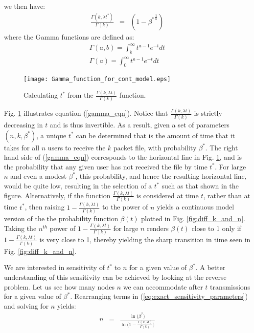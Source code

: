 we then have:
\begin{eqnarray} \label{gamma_eqn}
\frac{\Gamma(k,\lambda t^{*})}{\Gamma(k)} & = &  \left( 1 - {\beta^{*}}^\frac{1}{n} \right)  \label{eq:exact_sensitivity_parameters}
\end{eqnarray}
where the Gamma functions are defined as:
\begin{eqnarray}
\Gamma(a,b) = \int_{b}^{\infty} t^{a-1} e^{-t} dt \nonumber \\ 
\Gamma(a) = \int_{0}^{\infty} t^{a-1} e^{-t} dt \nonumber 
\end{eqnarray}

\begin{figure} [ht]
\centering
\texttt{[image: Gamma\_function\_for\_cont\_model.eps]}
\caption{Calculating $t^{*}$ from the $\frac{\Gamma(k,\lambda t)}{\Gamma(k)}$ function.}
\label{fig:Gamma_function_for_cont_model}
\end{figure}
Fig. \ref{fig:Gamma_function_for_cont_model} illustrates equation (\ref{gamma_eqn}). Notice that $\frac{\Gamma(k,\lambda t)}{\Gamma(k)}$ is strictly decreasing in $t$ and is thus invertible. As a result, given a set of parameters $(n,k,\beta^{*})$, a unique $t^{*}$ can be determined that is the amount of time that it takes for all $n$ users to receive the $k$ packet file, with probability $\beta^{*}$. The right hand side of (\ref{gamma_eqn}) corresponds to the horizontal line in Fig. \ref{fig:Gamma_function_for_cont_model}, and is the probability that any given user has not received the file by time $t^{*}$. For large $n$ and even a modest $\beta^{*}$, this probability, and hence the resulting horizontal line, would be quite low, resulting in the selection of a $t^{*}$ such as that shown in the figure. Alternatively, if the function $\frac{\Gamma(k,\lambda t)}{\Gamma(k)}$ is considered at time $t$, rather than at time $t^*$, then raising $1 - \frac{\Gamma(k,\lambda  t)}{\Gamma(k)}$ to the power of $n$ yields a continuous model version of the the probability function $\beta(t)$ plotted in Fig. \ref{fig:diff_k_and_n}. Taking the $n^{th}$ power of $1 - \frac{\Gamma(k,\lambda  t)}{\Gamma(k)}$ for large $n$ renders $\beta(t)$ close to 1 only if $1 - \frac{\Gamma(k,\lambda  t)}{\Gamma(k)}$ is very close to 1, thereby yielding the sharp transition in time seen in Fig. \ref{fig:diff_k_and_n}.

We are interested in sensitivity of $t^{*}$ to $n$ for a given value of $\beta^{*}$. A better understanding of this sensitivity can be achieved by looking at the reverse problem. Let us see how many nodes $n$ we can accommodate after $t$ transmissions for a given value of $\beta^{*}$. Rearranging terms in (\ref{eq:exact_sensitivity_parameters}) and solving for $n$ yields: 
\begin{eqnarray}
n & = & \frac{\ln \big(\beta^{*}\big) }{\ln \Big( 1 - \frac{\Gamma(k,\lambda t)}{\Gamma(k)} \Big)} \label{eq:exact_sensitivity_for_figures}
\end{eqnarray}

